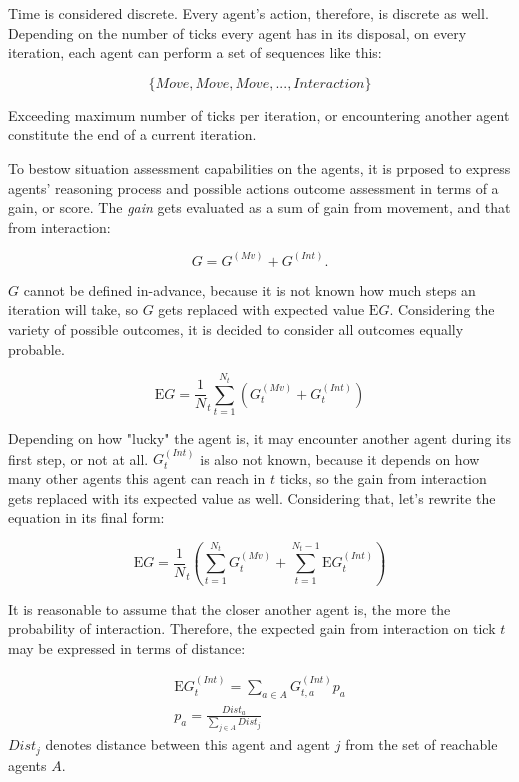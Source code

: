 Time is considered discrete. Every agent's action, therefore, is discrete as well. Depending on the number of ticks
every agent has in its disposal, on every iteration, each agent can perform a set of sequences like this:

$$
    \{Move, Move, Move, ..., Interaction\}
$$

Exceeding maximum number of ticks per iteration, or encountering another agent constitute the end of a current iteration.

To bestow situation assessment capabilities on the agents, it is prposed to express agents' reasoning process and
possible actions outcome assessment in terms of a gain, or score. The \textit{gain} gets evaluated as a sum of gain from
movement, and that from interaction:

$$
G = G^{(Mv)} + G^{(Int)}.
$$

$G$ cannot be defined in-advance, because it is not known how much steps an iteration will take, so $G$ gets replaced
with expected value $\mathrm{E}G$. Considering the variety of possible outcomes, it is decided to consider all outcomes
equally probable.

$$
    \mathrm{E}G = \frac 1 N_t \sum_{t=1}^{N_t}{(G^{(Mv)}_t + G^{(Int)}_t)}
$$

Depending on how "lucky" the agent is, it may encounter another agent during its first step, or not at all.
$G^{(Int)}_t$ is also not known, because it depends on how many other agents this agent can reach in $t$ ticks, so the
gain from interaction gets replaced with its expected value as well. Considering that, let's rewrite the equation in its
final form:

\begin{equation}
    \mathrm{E}{G} = \frac 1 N_t (\sum_{t=1}^{N_t}{G^{(Mv)}_t} + \sum_{t=1}^{N_t - 1}{\mathrm{E}G^{(Int)}_t})
\end{equation}

It is reasonable to assume that the closer another agent is, the more the probability of interaction. Therefore, the
expected gain from interaction on tick $t$ may be expressed in terms of distance:

\begin{equation}
    \begin{gathered}
        \mathrm{E}G^{(Int)}_t = \sum_{a \in A}{G^{(Int)}_{t,a}p_{a}}\\
        p_{a} = \frac {Dist_a} {\sum_{j \in A}{Dist_j}}
    \end{gathered}
\end{equation}
$Dist_j$ denotes distance between this agent and agent $j$ from the set of reachable agents $A$.
